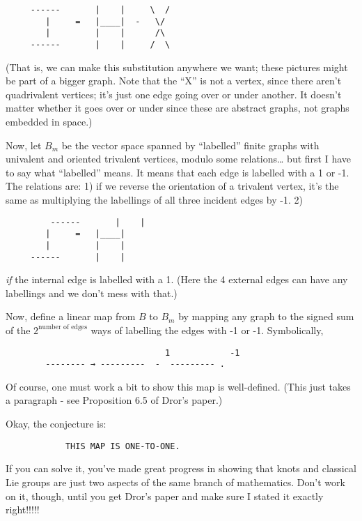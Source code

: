 \documentclass{article}
\begin{document}
\begin{verbatim}
     ------       |    |     \  /
        |     =   |____|  -   \/
        |         |    |      /\
     ------       |    |     /  \
\end{verbatim}

(That is, we can make this substitution anywhere we want; these pictures
might be part of a bigger graph. Note that the ``X'' is not a vertex,
since there aren't quadrivalent vertices; it's just one edge going over
or under another. It doesn't matter whether it goes over or under since
these are abstract graphs, not graphs embedded in space.)

Now, let \(B_m\) be the vector space spanned by ``labelled'' finite
graphs with univalent and oriented trivalent vertices, modulo some
relations\ldots{} but first I have to say what ``labelled'' means. It
means that each edge is labelled with a 1 or -1. The relations are: 1)
if we reverse the orientation of a trivalent vertex, it's the same as
multiplying the labellings of all three incident edges by -1. 2)

\begin{verbatim}
         ------       |    |     
        |     =   |____|  
        |         |    |     
     ------       |    |     
\end{verbatim}

\emph{if} the internal edge is labelled with a 1. (Here the 4 external
edges can have any labellings and we don't mess with that.)

Now, define a linear map from \(B\) to \(B_m\) by mapping any graph to
the signed sum of the \(2^\text{number of edges}\) ways of labelling the
edges with -1 or -1. Symbolically,

\begin{verbatim}
                                1            -1
        -------- → ---------  -  --------- .
\end{verbatim}

Of course, one must work a bit to show this map is well-defined. (This
just takes a paragraph - see Proposition 6.5 of Dror's paper.)

Okay, the conjecture is:

\begin{verbatim}
            THIS MAP IS ONE-TO-ONE.
\end{verbatim}

If you can solve it, you've made great progress in showing that knots
and classical Lie groups are just two aspects of the same branch of
mathematics. Don't work on it, though, until you get Dror's paper and
make sure I stated it exactly right!!!!!
\end{document}

